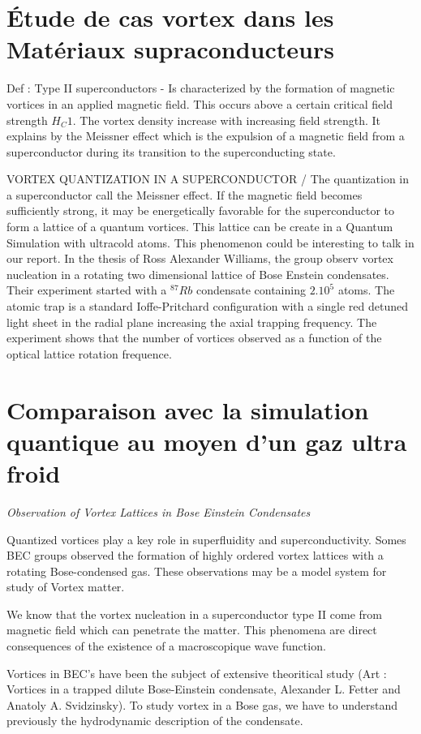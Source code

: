 \documentclass[a4paper]{article}
\begin{document}
\begin{multicols}{2}
\section{Étude de cas vortex dans les Matériaux supraconducteurs}

Def : Type II superconductors -
Is characterized by the formation of magnetic vortices in an applied magnetic field. This occurs above a certain critical field strength $H_C1$. The vortex density increase with increasing field strength. It explains by the Meissner effect which is the expulsion of a magnetic field from a superconductor during its transition to the superconducting state.

VORTEX QUANTIZATION IN A SUPERCONDUCTOR /
The quantization in a superconductor call the Meissner effect. If the magnetic field becomes sufficiently strong, it may be energetically favorable for the superconductor to form a lattice of a quantum vortices. This lattice can be create in a Quantum Simulation with ultracold atoms. This phenomenon could be interesting to talk in our report. 
In the thesis of Ross Alexander Williams, the group observ vortex nucleation in a rotating two dimensional lattice of Bose Enstein condensates. Their experiment started with a $^{87}Rb$ condensate containing $2.10^{5}$ atoms. The atomic trap is a standard Ioffe-Pritchard configuration with a single red detuned light sheet in the radial plane increasing the axial trapping frequency. 
The experiment shows that the number of vortices observed as a function of the optical lattice rotation frequence. 


\section{Comparaison avec la simulation quantique au moyen d'un gaz ultra froid}

\textit{Observation of Vortex Lattices in Bose Einstein Condensates
}

Quantized vortices play a key role in superfluidity and superconductivity. Somes BEC groups observed the formation of highly ordered vortex lattices with a rotating Bose-condensed gas.
These observations may be a model system for study of Vortex matter.

We know that the vortex nucleation in a superconductor type II come from magnetic field which can penetrate the matter. This phenomena are direct consequences of the existence of a macroscopique wave function.

Vortices in BEC’s have been the subject of extensive theoritical study (Art : Vortices in a trapped dilute Bose-Einstein condensate, Alexander L. Fetter and Anatoly A. Svidzinsky). 
To study vortex in a Bose gas, we have to understand previously the hydrodynamic description of the condensate.


\end{multicols}
\end{document}
